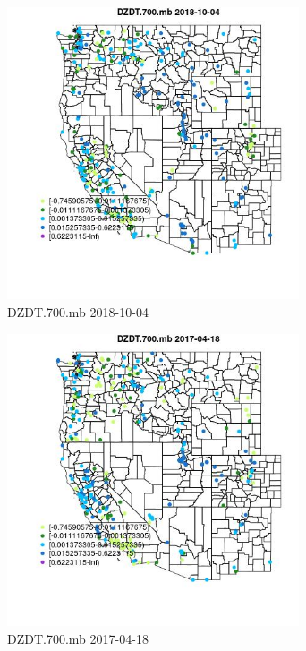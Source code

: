 \begin{figure} 
\centering  
\includegraphics[width=0.77\textwidth]{Code_Outputs/Report_ML_input_PM25_Step4_part_f_de_duplicated_aveswNAs_MapObsDZDT700mb2018-10-04.jpg} 
\caption{\label{fig:Report_ML_input_PM25_Step4_part_f_de_duplicated_aveswNAsMapObsDZDT700mb2018-10-04}DZDT.700.mb 2018-10-04} 
\end{figure} 
 

\begin{figure} 
\centering  
\includegraphics[width=0.77\textwidth]{Code_Outputs/Report_ML_input_PM25_Step4_part_f_de_duplicated_aveswNAs_MapObsDZDT700mb2017-04-18.jpg} 
\caption{\label{fig:Report_ML_input_PM25_Step4_part_f_de_duplicated_aveswNAsMapObsDZDT700mb2017-04-18}DZDT.700.mb 2017-04-18} 
\end{figure} 
 

